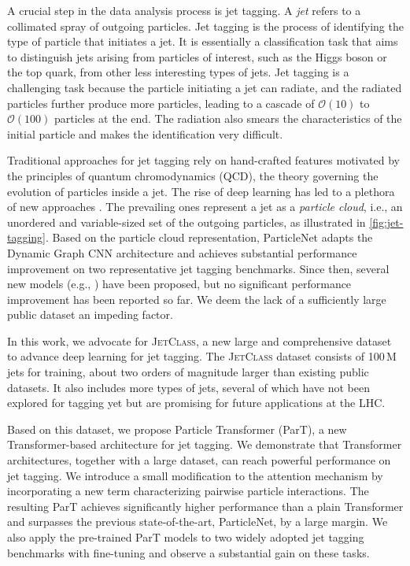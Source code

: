 \documentclass[nohyperref]{article}
\theoremstyle{plain}
\theoremstyle{definition}
\theoremstyle{remark}
\newcommand{\jetclass}{{\textsc{JetClass}}\xspace}
\begin{document}
A crucial step in the data analysis process is jet tagging. A \textit{jet} refers to a collimated spray of outgoing particles. Jet tagging is the process of identifying the type of particle that initiates a jet. It is essentially a classification task that aims to distinguish jets arising from particles of interest, such as the Higgs boson or the top quark, from other less interesting types of jets. Jet tagging is a challenging task because the particle initiating a jet can radiate, and the radiated particles further produce more particles, leading to a cascade of $\mathcal{O}(10)$ to $\mathcal{O}(100)$ particles at the end. The radiation also smears the characteristics of the initial particle and makes the identification very difficult. 

Traditional approaches for jet tagging rely on hand-crafted features motivated by the principles of quantum chromodynamics (QCD), the theory governing the evolution of particles inside a jet. The rise of deep learning has led to a plethora of new approaches \cite{Larkoski:2017jix}. The prevailing ones represent a jet as a \textit{particle cloud}, i.e., an unordered and variable-sized set of the outgoing particles, as illustrated in \cref{fig:jet-tagging}. Based on the particle cloud representation, ParticleNet \cite{Qu:2019gqs} adapts the Dynamic Graph CNN architecture \cite{dgcnn} and achieves substantial performance improvement on two representative jet tagging benchmarks. 
Since then, several new models (e.g., \citet{Mikuni:2020wpr,Mikuni:2021pou,Shimmin:2021pkm}) have been proposed, but no significant performance improvement has been reported so far. We deem the lack of a sufficiently large public dataset an impeding factor.

In this work, we advocate for \jetclass, a new large and comprehensive dataset to advance deep learning for jet tagging. The \jetclass dataset \cite{jetclass} consists of 100\,M jets for training, about two orders of magnitude larger than existing public datasets. It also includes more types of jets, several of which have not been explored for tagging yet but are promising for future applications at the LHC. 

Based on this dataset, we propose Particle Transformer (ParT), a new Transformer-based architecture for jet tagging. We demonstrate that Transformer architectures, together with a large dataset, can reach powerful performance on jet tagging. We introduce a small modification to the attention mechanism by incorporating a new term characterizing pairwise particle interactions. The resulting ParT achieves significantly higher performance than a plain Transformer and surpasses the previous state-of-the-art, ParticleNet, by a large margin. We also apply the pre-trained ParT models to two widely adopted jet tagging benchmarks with fine-tuning and observe a substantial gain on these tasks. 
\end{document}
